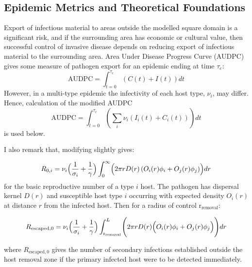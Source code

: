 \documentclass[11pt,letterpaper]{article}
\begin{document}
\subsection*{Epidemic Metrics and Theoretical Foundations} 
Export of infectious material to areas outside the modelled square domain is a significant risk, and if the surrounding area has economic or cultural value, then successful control of invasive disease depends on reducing export of infectious material to the surrounding area. Area Under Disease Progress Curve (AUDPC) gives some measure of pathogen export \cite{Cunniffe2015} for an epidemic ending at time $\tau_{e}$: 
\begin{equation}
	\mathrm{AUDPC} = \int_{t = 0}^{\tau_{e}}\left( C(t) + I(t)\right)  dt  
\end{equation}
However, in a multi-type epidemic the infectivity of each host type, $\nu_{i}$, may differ. Hence, calculation of the modified AUDPC 
\begin{equation}
	\mathrm{AUDPC} = \int_{t = 0}^{\tau_{e}} \left( \sum_{i} \nu_{i} (I_{i}(t) + C_{i}(t)) \right) dt
\end{equation}
is used below.

I also remark that, modifying \cite{vandenBosch2024} slightly gives:

\begin{equation}
	R_{0, i} = \nu_{i} \Bigl(\frac{1}{\sigma_{i}} +  \frac{1} {\gamma} \Bigr)   \int_{0}^{\infty} \Bigl(  2 \pi r D(r) \left( O_i(r)\phi_{i} + O_{j}(r)\phi_{j} \right) \Bigr) dr
\end{equation}
for the basic reproductive number of a type $i$ host. The pathogen has dispersal kernel $D(r)$ and susceptible host type $i$ occurring with expected density $O_{i}(r)$ at distance $r$ from the infected host.  Then for a radius of control $\mathrm{r}_{\mathrm{removal}}$:

\begin{equation}
	\label{gnocont}
	R_{\mathrm{escaped}, 0} = \nu_{i} \Bigl(\frac{1}{\sigma_{i}} +  \frac{1} {\gamma} \Bigr) \int_{\mathrm{r}_\mathrm{removal}}^{L}  \Biggl( 2 \pi r D(r)\Bigl( O_i(r)\phi_{i} + O_{j}(r)\phi_{j} \Bigr)\Biggr) dr
\end{equation}

where $R_{\mathrm{escaped},0}$ gives the number of secondary infections established outside the host removal zone if the primary infected host were to be detected immediately. 
\end{document}
